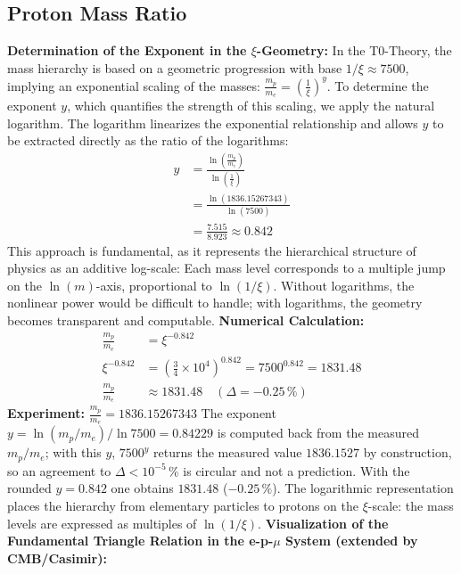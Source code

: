 	\subsection{Proton Mass Ratio}
	\textbf{Determination of the Exponent in the $\xi$-Geometry:}
	In the T0-Theory, the mass hierarchy is based on a geometric progression with base $1/\xi \approx 7500$, implying an exponential scaling of the masses: $\frac{m_p}{m_e} = \left(\frac{1}{\xi}\right)^y$. To determine the exponent $y$, which quantifies the strength of this scaling, we apply the natural logarithm. The logarithm linearizes the exponential relationship and allows $y$ to be extracted directly as the ratio of the logarithms:
	\begin{align}
		y &= \frac{\ln \left( \frac{m_p}{m_e} \right)}{\ln \left( \frac{1}{\xi} \right)} \\
		&= \frac{\ln (1836.15267343)}{\ln (7500)} \\
		&= \frac{7.515}{8.923} \approx 0.842
	\end{align}
	This approach is fundamental, as it represents the hierarchical structure of physics as an additive log-scale: Each mass level corresponds to a multiple jump on the $\ln(m)$-axis, proportional to $\ln(1/\xi)$. Without logarithms, the nonlinear power would be difficult to handle; with logarithms, the geometry becomes transparent and computable.
	\textbf{Numerical Calculation:}
	\begin{align}
		\frac{m_p}{m_e} &= \xi^{-0.842} \\
		\xi^{-0.842} &= \left( \frac{3}{4} \times 10^{4} \right)^{0.842} = 7500^{0.842} = 1831.48 \\
		\frac{m_p}{m_e} &\approx 1831.48 \quad (\Delta = -0.25\,\%)
	\end{align}
	\textbf{Experiment:} $\frac{m_p}{m_e} = 1836.15267343$
	The exponent $y = \ln(m_p/m_e)/\ln 7500 = 0.84229$ is computed back from the measured $m_p/m_e$; with this $y$, $7500^{y}$ returns the measured value $1836.1527$ by construction, so an agreement to $\Delta < 10^{-5}\,\%$ is circular and not a prediction. With the rounded $y = 0.842$ one obtains $1831.48$ ($-0.25\,\%$). The logarithmic representation places the hierarchy from elementary particles to protons on the $\xi$-scale: the mass levels are expressed as multiples of $\ln(1/\xi)$.
	\textbf{Visualization of the Fundamental Triangle Relation in the e-p-$\mu$ System (extended by CMB/Casimir):}
